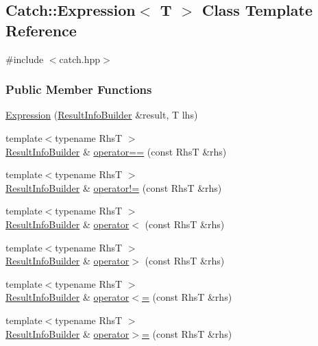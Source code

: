 \hypertarget{classCatch_1_1Expression}{\subsection{Catch\-:\-:Expression$<$ T $>$ Class Template Reference}
\label{classCatch_1_1Expression}
}


{\ttfamily \#include $<$catch.\-hpp$>$}

\subsubsection*{Public Member Functions}
\begin{DoxyCompactItemize}
\item 
\hyperlink{classCatch_1_1Expression_ad5502009f1d9653ba09f4171c35528b4}{Expression} (\hyperlink{classCatch_1_1ResultInfoBuilder}{Result\-Info\-Builder} \&result, T lhs)
\item 
{\footnotesize template$<$typename Rhs\-T $>$ }\\\hyperlink{classCatch_1_1ResultInfoBuilder}{Result\-Info\-Builder} \& \hyperlink{classCatch_1_1Expression_ae6be91d91dea612743f3165caf5ea943}{operator==} (const Rhs\-T \&rhs)
\item 
{\footnotesize template$<$typename Rhs\-T $>$ }\\\hyperlink{classCatch_1_1ResultInfoBuilder}{Result\-Info\-Builder} \& \hyperlink{classCatch_1_1Expression_acd9e24e866370bda640156191f41be0c}{operator!=} (const Rhs\-T \&rhs)
\item 
{\footnotesize template$<$typename Rhs\-T $>$ }\\\hyperlink{classCatch_1_1ResultInfoBuilder}{Result\-Info\-Builder} \& \hyperlink{classCatch_1_1Expression_ac4cd605b13884865d9d2654f759b242b}{operator$<$} (const Rhs\-T \&rhs)
\item 
{\footnotesize template$<$typename Rhs\-T $>$ }\\\hyperlink{classCatch_1_1ResultInfoBuilder}{Result\-Info\-Builder} \& \hyperlink{classCatch_1_1Expression_a683e967108380ceb955dfc152c7874d0}{operator$>$} (const Rhs\-T \&rhs)
\item 
{\footnotesize template$<$typename Rhs\-T $>$ }\\\hyperlink{classCatch_1_1ResultInfoBuilder}{Result\-Info\-Builder} \& \hyperlink{classCatch_1_1Expression_ad7273b285b2d9ea81ac580ee9951eeac}{operator$<$=} (const Rhs\-T \&rhs)
\item 
{\footnotesize template$<$typename Rhs\-T $>$ }\\\hyperlink{classCatch_1_1ResultInfoBuilder}{Result\-Info\-Builder} \& \hyperlink{classCatch_1_1Expression_adfa8af4179fe39b8465a4b011d80432f}{operator$>$=} (const Rhs\-T \&rhs)

\end{DoxyCompactItemize}
